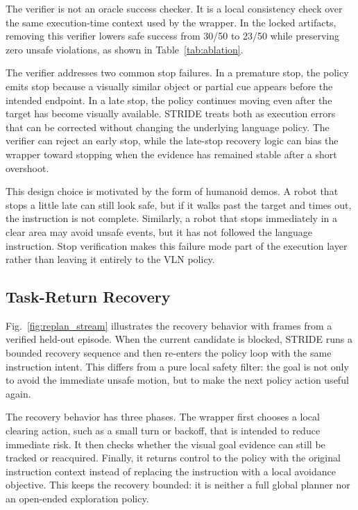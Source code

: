 \documentclass[letterpaper,10pt,conference]{ieeeconf}
\begin{document}
The verifier is not an oracle success checker. It is a local consistency check over the same execution-time context used by the wrapper. In the locked artifacts, removing this verifier lowers safe success from 30/50 to 23/50 while preserving zero unsafe violations, as shown in Table~\ref{tab:ablation}.

The verifier addresses two common stop failures. In a premature stop, the policy emits stop because a visually similar object or partial cue appears before the intended endpoint. In a late stop, the policy continues moving even after the target has become visually available. STRIDE treats both as execution errors that can be corrected without changing the underlying language policy. The verifier can reject an early stop, while the late-stop recovery logic can bias the wrapper toward stopping when the evidence has remained stable after a short overshoot.

This design choice is motivated by the form of humanoid demos. A robot that stops a little late can still look safe, but if it walks past the target and times out, the instruction is not complete. Similarly, a robot that stops immediately in a clear area may avoid unsafe events, but it has not followed the language instruction. Stop verification makes this failure mode part of the execution layer rather than leaving it entirely to the VLN policy.

\subsection{Task-Return Recovery}
Fig.~\ref{fig:replan_stream} illustrates the recovery behavior with frames from a verified held-out episode. When the current candidate is blocked, STRIDE runs a bounded recovery sequence and then re-enters the policy loop with the same instruction intent. This differs from a pure local safety filter: the goal is not only to avoid the immediate unsafe motion, but to make the next policy action useful again.

The recovery behavior has three phases. The wrapper first chooses a local clearing action, such as a small turn or backoff, that is intended to reduce immediate risk. It then checks whether the visual goal evidence can still be tracked or reacquired. Finally, it returns control to the policy with the original instruction context instead of replacing the instruction with a local avoidance objective. This keeps the recovery bounded: it is neither a full global planner nor an open-ended exploration policy.
\end{document}
